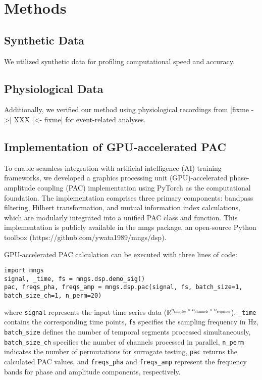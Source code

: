 
\section{Methods}
\subsection{Synthetic Data}
We utilized synthetic data for profiling computational speed and accuracy.

\subsection{Physiological Data}
Additionally, we verified our method using physiological recordings from [fixme ->] XXX [<- fixme] for event-related analyses.


\subsection{Implementation of GPU-accelerated PAC}
To enable seamless integration with artificial intelligence (AI) training frameworks, we developed a graphics processing unit (GPU)-accelerated phase-amplitude coupling (PAC) implementation using PyTorch as the computational foundation. The implementation comprises three primary components: bandpass filtering, Hilbert transformation, and mutual information index calculations, which are modularly integrated into a unified PAC class and function. This implementation is publicly available in the mngs package, an open-source Python toolbox (https://github.com/ywata1989/mngs/dsp).

\indent GPU-accelerated PAC calculation can be executed with three lines of code:
\begin{verbatim}
import mngs
signal, _time, fs = mngs.dsp.demo_sig()
pac, freqs_pha, freqs_amp = mngs.dsp.pac(signal, fs, batch_size=1, batch_size_ch=1, n_perm=20)
\end{verbatim}
where \texttt{signal} represents the input time series data ($\mathbb{R}^{n_\text{samples} \times n_\text{channels} \times n_\text{sequence}}$), \texttt{\_time} contains the corresponding time points, \texttt{fs} specifies the sampling frequency in Hz, \texttt{batch\_size} defines the number of temporal segments processed simultaneously, \texttt{batch\_size\_ch} specifies the number of channels processed in parallel, \texttt{n\_perm} indicates the number of permutations for surrogate testing, \texttt{pac} returns the calculated PAC values, and \texttt{freqs\_pha} and \texttt{freqs\_amp} represent the frequency bands for phase and amplitude components, respectively.

